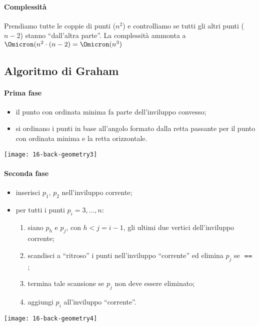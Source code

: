 
\paragraph{Complessità}
Prendiamo tutte le coppie di punti (\(n^2\)) e controlliamo se tutti gli altri punti (\(n-2\)) stanno \enquote{dall'altra parte}.
La complessità ammonta a \(\Omicron(n^2 \cdot (n-2) = \Omicron(n^3)\)

\newpage
\subsection{Algoritmo di Graham}

\begin{minipage}[c]{.5\linewidth}
	\paragraph{Prima fase}
	\begin{itemize}
		\item il punto con ordinata minima fa parte dell'inviluppo convesso;
		\item si ordinano i punti in base all'angolo formato dalla retta passante per il punto con ordinata minima e la retta orizzontale.
	\end{itemize}
\end{minipage}\hfill
\begin{minipage}[c]{.4\linewidth}
	\centering
	\texttt{[image: 16-back-geometry3]}
\end{minipage}

\begin{minipage}[c]{.5\linewidth}
	\paragraph{Seconda fase}
	\begin{itemize}
		\item inserisci \(p_1\), \(p_2\) nell'inviluppo corrente;
		\item per tutti i punti \(p_i = 3, \dots, n\):
		\begin{enumerate}
			\item siano \(p_h\) e \(p_j\), con \(h < j = i - 1\), gli ultimi due vertici dell'inviluppo corrente;
			\item scandisci a \enquote{ritroso} i punti nell'inviluppo \enquote{corrente} ed elimina \(p_j\) se  \(\Equal\) \False;
			\item termina tale scansione se \(p_j\) non deve essere eliminato;
			\item aggiungi \(p_i\) all'inviluppo \enquote{corrente}.
		\end{enumerate}
	\end{itemize}
\end{minipage}\hfill
\begin{minipage}[c]{.4\linewidth}
	\centering
	\texttt{[image: 16-back-geometry4]}
\end{minipage}

